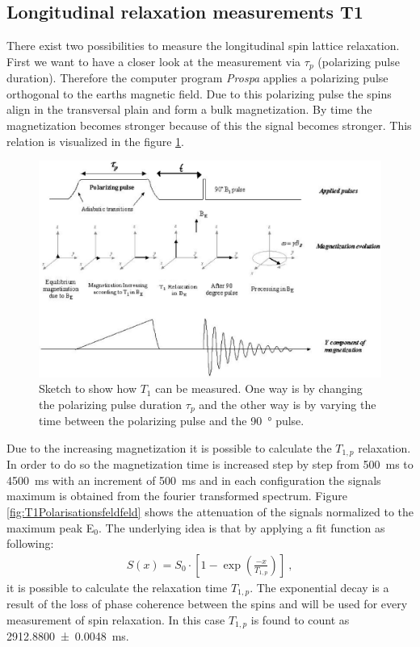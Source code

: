 \subsection{Longitudinal relaxation measurements T1}
\label{sec:LongitudinalrelaxationmeasurementsT1}
There exist two possibilities to measure the longitudinal spin lattice relaxation.
First we want to have a closer look at the measurement via $\tau_p$ (polarizing pulse duration).
Therefore the computer program \textit{Prospa} applies a polarizing pulse orthogonal to the earths magnetic field.
Due to this polarizing pulse the spins align in the transversal plain and form a bulk magnetization.
By time the magnetization becomes stronger because of this the signal becomes stronger.
This relation is visualized in the figure \ref{fig:BildT1}.

\begin{figure}[H]
    \centering
    \includegraphics[width= \textwidth]{Abbildungen/BildT1.png}   
    \caption[Sketch to show how $T_1$ can be measured. \cite{Bild}]{Sketch to show how $T_1$ can be measured.
    One way is by changing the polarizing pulse duration $\tau_p$ and the other way is by varying the time between the polarizing pulse and the \SI{90}{\degree} pulse. \cite{Bild}}
    \label{fig:BildT1}
\end{figure}

Due to the increasing magnetization it is possible to calculate the $T_{1,p}$ relaxation.
In order to do so the magnetization time is increased step by step from \SI{500}{\milli \second} to \SI{4500}{\milli \second} with an increment of \SI{500}{\milli \second} and in each configuration the signals maximum is obtained from the fourier transformed spectrum.
Figure \ref{fig:T1Polarisationsfeldfeld} shows the attenuation of the signals normalized to the maximum peak E$_0$.
The underlying idea is that by applying a fit function as following:
\begin{align}
    S(x)=S_0 \cdot \left[1-\exp\left(\frac{-x}{T_{1,p}}\right)\right] \ ,
    \label{eq: fitBp}
\end{align}
it is possible to calculate the relaxation time $T_{1,p}$.
The exponential decay is a result of the loss of phase coherence between the spins and will be used for every measurement of spin relaxation.
In this case $T_{1,p}$ is found to count as \SI{2912.8800 \pm 0.0048}{\milli \second}.

